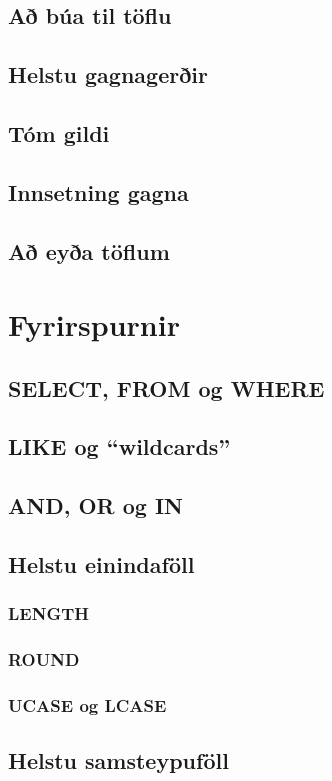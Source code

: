 \documentclass[nohyper,notoc,justified]{tufte-book}
\begin{document}
\section{Að búa til töflu} %
\section{Helstu gagnagerðir} %
\section{Tóm gildi} %
\section{Innsetning gagna} %
\section{Að eyða töflum} %

\chapter{Fyrirspurnir}
\section{SELECT, FROM og WHERE}
\section{LIKE og ``wildcards''}
\section{AND, OR og IN}
\section{Helstu einindaföll}
\subsection{LENGTH}
\subsection{ROUND}
\subsection{UCASE og LCASE}
\section{Helstu samsteypuföll}
\end{document}
